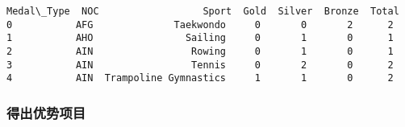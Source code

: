 \documentclass[11pt]{article}
\makeatletter
\newcommand{\boxspacing}{\kern\kvtcb@left@rule\kern\kvtcb@boxsep}
\newcommand{\prompt}[4]{
        {\ttfamily\llap{{\color{#2}[#3]:\hspace{3pt}#4}}\vspace{-\baselineskip}}
    }
\makeatother
\begin{document}
            \begin{tcolorbox}[breakable, size=fbox, boxrule=.5pt, pad at break*=1mm, opacityfill=0]
\prompt{Out}{outcolor}{69}{\boxspacing}
\begin{Verbatim}[commandchars=\\\{\}]
Medal\_Type  NOC                  Sport  Gold  Silver  Bronze  Total
0           AFG              Taekwondo     0       0       2      2
1           AHO                Sailing     0       1       0      1
2           AIN                 Rowing     0       1       0      1
3           AIN                 Tennis     0       2       0      2
4           AIN  Trampoline Gymnastics     1       1       0      2
\end{Verbatim}
\end{tcolorbox}
        
    \subsubsection{得出优势项目}\label{ux5f97ux51faux4f18ux52bfux9879ux76ee}
\end{document}

